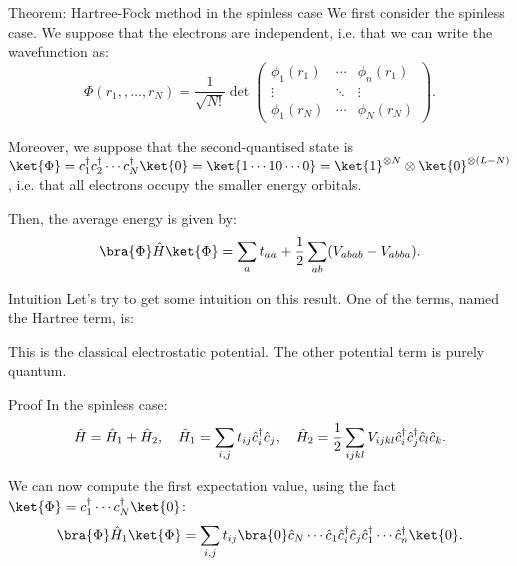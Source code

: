\documentclass[a4paper]{article}
\begin{document}
\begin{parag}{Theorem: Hartree-Fock method in the spinless case}
    We first consider the spinless case. We suppose that the electrons are independent, i.e. that we can write the wavefunction as:
    \[\Phi\left(r_1,, \ldots, r_N\right) = \frac{1}{\sqrt{N!}} \det \begin{pmatrix} \phi_1\left(r_1\right) & \cdots & \phi_n\left(r_1\right) \\ \vdots & \ddots & \vdots \\ \phi_1\left(r_N\right) & \cdots & \phi_N\left(r_N\right) \end{pmatrix}.\]

    Moreover, we suppose that the second-quantised state is $\ket{\Phi} = c_1^{\dagger} c_2^{\dagger} \cdots c_N^{\dagger} \ket{0} = \ket{1 \cdots 1 0 \cdots 0} = \ket{1}^{\otimes N} \otimes \ket{0}^{\otimes \left(L-N\right)}$, i.e. that all electrons occupy the smaller energy orbitals.

    Then, the average energy is given by:
    \[\bra{\Phi} \hat{H} \ket{\Phi} = \sum_{a} t_{aa} + \frac{1}{2} \sum_{a b} \left(V_{abab} - V_{abba}\right).\]

    \begin{subparag}{Intuition}
        Let's try to get some intuition on this result. One of the terms, named the Hartree term, is: 

        This is the classical electrostatic potential. The other potential term is purely quantum.
    \end{subparag}

    \begin{subparag}{Proof}
        In the spinless case: 
        \[\hat{H} = \hat{H}_1 + \hat{H}_2, \quad \hat{H}_1 = \sum_{i, j} t_{i j} \hat{c}_i^{\dagger} \hat{c}_j, \quad \hat{H}_2 = \frac{1}{2}\sum_{i j k l} V_{ijkl} \hat{c}_i^{\dagger} \hat{c}_j^{\dagger} \hat{c}_l \hat{c}_k.\]
        
        We can now compute the first expectation value, using the fact $\ket{\Phi} = c_1^{\dagger} \cdots c_N^{\dagger} \ket{0}$: 
        \[\bra{\Phi} \hat{H}_1 \ket{\Phi} = \sum_{i, j} t_{ij} \bra{0} \hat{c}_N \cdots \hat{c}_1 \hat{c}_i^{\dagger} \hat{c}_j \hat{c}_1^{\dagger} \cdots \hat{c}_n^{\dagger} \ket{0}.\]


\end{subparag}
\end{parag}
\end{document}

